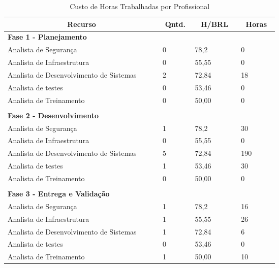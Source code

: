 \begin{enumerate}
    \begin{table}[H]
    \caption{Custo de Horas Trabalhadas por Profissional}
    \label{custo-projeto-horas-trabalhadas}
    	\centering\footnotesize
        \begin{tabular}{|p{0.40\linewidth} | p{0.04\linewidth} | p{0.10\linewidth} |  p{0.08\linewidth} | }  \hline
        \multicolumn{1}{|c|}{\textbf{Recurso}} &
        \multicolumn{1}{|c|}{\textbf{Qntd.}} &
        \multicolumn{1}{c|}{\textbf{H/BRL}} &
        \multicolumn{1}{c|}{\textbf{Horas}} \\ \hline
          
        {\textbf{Fase 1 - Planejamento}}    &   &    &          \\  \hline
        Analista de Segurança & 0 & 78,2 & 0            \\ \hline
        Analista de Infraestrutura & 0 & 55,55 & 0         \\ \hline
        Analista de Desenvolvimento de Sistemas & 2 & 72,84 & 18              \\ \hline
        Analista de testes &  0 &  53,46 & 0                              \\\hline
        Analista de Treinamento &  0 &  50,00 & 0                          \\\hline
            & &  & \\ \hline
       {\textbf{Fase 2 - Desenvolvimento}}    &   &    &          \\  \hline
        Analista de Segurança & 1 & 78,2 & 30            \\ \hline
        Analista de Infraestrutura & 0 & 55,55 & 0         \\ \hline
        Analista de Desenvolvimento de Sistemas & 5 & 72,84 & 190              \\ \hline
        Analista de testes &  1 &  53,46 & 30                              \\\hline
        Analista de Treinamento &  0 &  50,00 & 0                          \\\hline
            & &  & \\ \hline
       {\textbf{Fase 3 - Entrega e Validação}}    &   &    &         \\  \hline
        Analista de Segurança & 1 & 78,2 & 16            \\ \hline
        Analista de Infraestrutura & 1 & 55,55 & 26         \\ \hline
        Analista de Desenvolvimento de Sistemas & 1 & 72,84 & 6             \\ \hline
        Analista de testes &  0 &  53,46 & 0                              \\\hline
        Analista de Treinamento &  1 &  50,00 & 10                          \\\hline   
        \end{tabular}
    \end{table}
\end{enumerate}

